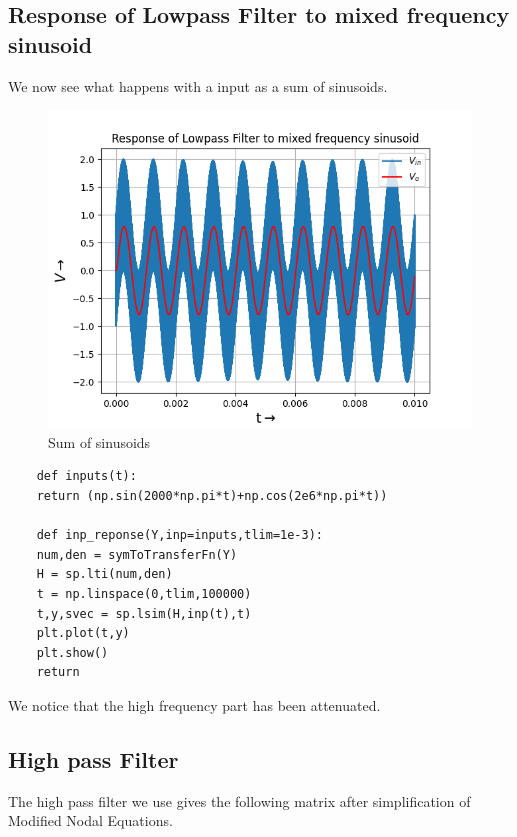 \documentclass{article}
\begin{document}
\subsection{Response of Lowpass Filter to mixed frequency sinusoid}
We now see what happens with a input as a sum of sinusoids.
\begin{figure}[h!]
	\centering
	\includegraphics[scale=0.6]{Figure_4}
	\caption{Sum of sinusoids}
	\label{fig:System Response with Decay = 0.05}
\end{figure}

\begin{lstlisting}
	def inputs(t):
	return (np.sin(2000*np.pi*t)+np.cos(2e6*np.pi*t))
	
	def inp_reponse(Y,inp=inputs,tlim=1e-3):
	num,den = symToTransferFn(Y)
	H = sp.lti(num,den)
	t = np.linspace(0,tlim,100000)
	t,y,svec = sp.lsim(H,inp(t),t)
	plt.plot(t,y)
	plt.show() 
	return
\end{lstlisting}

We notice that the high frequency part has been attenuated.



\clearpage
\subsection{High pass Filter}

The high pass filter we use gives the following matrix after simplification of Modified Nodal Equations.
\newline
\end{document}
